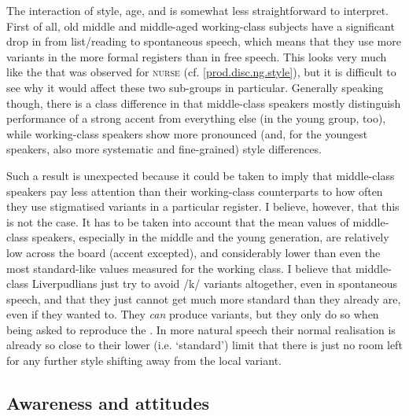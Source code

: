 The interaction of style, age, and  is somewhat less straightforward to interpret.
First of all, old middle and middle-aged working-class subjects have a significant drop in  from list/reading to spontaneous speech, which means that they use more  variants in the more formal registers than in free speech.
This looks very much like the  that was observed for \textsc{nurse} (cf. \ref{prod.disc.ng.style}), but it is difficult to see why it would affect these two sub-groups in particular.
Generally speaking though, there is a class difference in that middle-class speakers mostly distinguish performance of a strong accent from everything else (in the young group, too), while working-class speakers show more pronounced (and, for the youngest speakers, also more systematic and fine-grained) style differences.

Such a result is unexpected because it could be taken to imply that middle-class speakers pay less attention than their working-class counterparts to how often they use stigmatised variants in a particular register.
I believe, however, that this is not the case.
It has to be taken into account that the mean  values of middle-class speakers, especially in the middle and the young generation, are relatively low across the board (accent  excepted), and considerably lower than even the most standard-like values measured for the working class.
I believe that middle-class Liverpudlians just try to avoid  /k/ variants altogether, even in spontaneous speech, and that they just cannot get much more standard than they already are, even if they wanted to.
They \emph{can} produce  variants, but they only do so when being asked to reproduce the .
In more natural speech their normal realisation is already so close to their lower (i.e. `standard') limit that there is just no room left for any further style shifting away from the local variant.

\subsection{Awareness and attitudes}
\label{prod.disc.k.aware}

